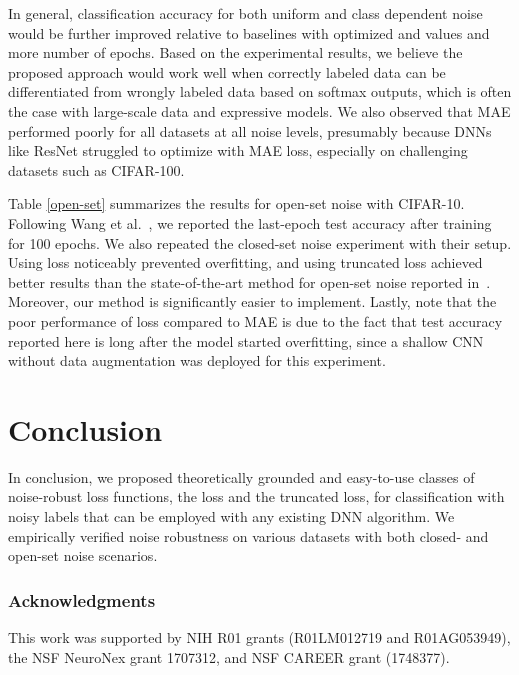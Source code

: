 \documentclass{article}
\begin{document}
In general, classification accuracy for both uniform and class dependent noise would be further improved relative to baselines with optimized  and  values and more number of epochs.
Based on the experimental results, we believe the proposed approach would work well when correctly labeled data can be differentiated from wrongly labeled data based on softmax outputs, which is often the case with large-scale data and expressive models.
We also observed that MAE performed poorly for all datasets at all noise levels, presumably because DNNs like ResNet struggled to optimize with MAE loss, especially on challenging datasets such as CIFAR-100.

Table \ref{open-set} summarizes the results for open-set noise with CIFAR-10. Following Wang et al.~\cite{wang2018iterative}, we reported the last-epoch test accuracy after training for 100 epochs. 
We also repeated the closed-set noise experiment with their setup. Using  loss noticeably prevented overfitting, and using truncated  loss achieved better results than the state-of-the-art method for open-set noise reported in~\cite{wang2018iterative}. Moreover, our method is significantly easier to implement. Lastly, note that the poor performance of  loss compared to MAE is due to the fact that test accuracy reported here is long after the model started overfitting, since a shallow CNN without data augmentation was deployed for this experiment.

\section{Conclusion}\label{sec_5}
In conclusion, we proposed theoretically grounded and easy-to-use classes of noise-robust loss functions, the  loss and the truncated  loss, for classification with noisy labels that can be employed with any existing DNN algorithm. We empirically verified noise robustness on various datasets with both closed- and open-set noise scenarios.

\subsubsection*{Acknowledgments}
This work was supported by NIH R01 grants (R01LM012719 and R01AG053949), the NSF NeuroNex grant 1707312, and NSF CAREER grant (1748377).




\newpage
\newtheorem{lemma}{Lemma}
\newtheorem{theorem}{Theorem}
\newtheorem*{remark}{Remark}
\end{document}
